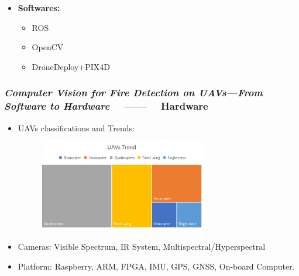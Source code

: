 \begin{frame}
\begin{itemize}
        \item \textbf{Softwares:}
            \begin{itemize}
                \item ROS
                \item OpenCV
                \item DroneDeploy+PIX4D
            \end{itemize}
    \end{itemize}
\end{frame}

\begin{frame}
    \frametitle{\textit{Computer Vision for Fire Detection on UAVs—From Software
    to Hardware} ~~------~~ Hardware}
    \begin{itemize}
        \item UAVs classifications and Trends:
            \begin{figure}[H]
                \centering
                \includegraphics[width=0.7\textwidth]{./imgs/UAV_Trends}
            \end{figure}
        \item Cameras: Visible Spectrum, IR System, Multispectral/Hyperspectral
        \item Platform: Raspberry, ARM, FPGA, IMU, GPS, GNSS, On-board Computer.
    \end{itemize}

\end{frame}
